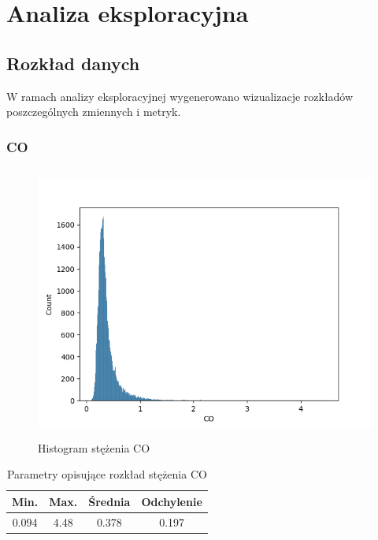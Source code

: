\documentclass[18pt, letterpaper]{article}
\begin{document}
\section{Analiza eksploracyjna}

\subsection{Rozkład danych}

W ramach analizy eksploracyjnej wygenerowano wizualizacje rozkładów poszczególnych zmiennych i metryk.

\subsubsection{CO}
\begin{figure}[H]
\centering
\includegraphics[width=120mm, height=90mm]{visualisations/histograms/CO_hist.png}
\caption{Histogram stężenia CO}
\end{figure}
\begin{table}[H]
\centering
\begin{tabular}{|c|c|c|c|}
\hline
Min.  & Max. & Średnia & Odchylenie \\ \hline
0.094 & 4.48 & 0.378   & 0.197      \\ \hline
\end{tabular}
\caption{Parametry opisujące rozkład stężenia CO}
\end{table}
\end{document}
